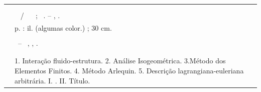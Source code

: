 %
\begin{fichacatalografica}
	\hspace{-1.4cm}
	\imprimirnotaautorizacao \\ \\
	\vspace*{\fill}					%
\begin{center}					%
  \imprimirnotabib \\
  \begin{table}[htb]
	\scriptsize
	\centering	
	\begin{tabular}{|p{0.9cm} p{8.7cm}|}
		\hline
	      & \\
		  &	  \imprimirautorficha     \\
		
		 \imprimircutter & 
							\hspace{0.4cm}\imprimirtitulo~  / ~\imprimirautor~ ;  ~\imprimirorientadorcorpoficha. -- 	\imprimirlocal, \imprimirdata.   \\
		
		  &  %
		
			\hspace{0.4cm}\pageref{LastPage} p. : il. (algumas color.) ; 30 cm.\\ 
		  & \\
		  & 
		    \hspace{0.4cm}\imprimirnotaficha ~--~ 
						  \imprimirunidademin, 
						  \imprimiruniversidademin, 
		                  \imprimirdata. \\ 
		  & \\                 
		  & \\ 
		  & \hspace{0.4cm}1. Interação fluido-estrutura. 2. Análise Isogeométrica. 3.Método dos Elementos
		  Finitos. 4. Método Arlequin. 5. Descrição lagrangiana-euleriana arbitrária. I. \imprimirorientadorficha. 
		   II. Título. \\
	

\end{tabular}
\end{table}
\end{center}
\end{fichacatalografica}
